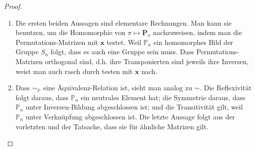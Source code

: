                 \begin{proof}

                    \begin{enumerate}[
                        label = {\texttt{ad} \arabic*.},
                        wide,
                        labelindent = 0pt
                    ]

                        \item Die ersten beiden Aussagen sind elementare Rechnungen.
                        Man kann sie benutzen, um die Homomorphie von $\pi \mapsto \mathbf P_\pi$ nachzuweisen, indem man die Permutations-Matrizen mit $\mathbf x$ testet.
                        Weil $\mathbb P_n$ ein homomorphes Bild der Gruppe $S_n$ folgt, dass es auch eine Gruppe sein muss.
                        Dass Permutations-Matrizen orthogonal sind, d.h. ihre Transponierten sind jeweils ihre Inversen, weist man auch rasch durch testen mit $\mathbf x$ nach.

                        \item Dass $\sim_{\mathbb P}$ eine Äquivalenz-Relation ist, sieht man analog zu $\sim$.
                        Die Reflexivität folgt daraus, dass $\mathbb P_n$ ein neutrales Element hat;
                        die Symmetrie daraus, dass $\mathbb P_n$ unter Inversen-Bildung abgeschlossen ist;
                        und die Transitivität gilt, weil $\mathbb P_n$ unter Verknüpfung abgeschlossen ist.
                        Die letzte Aussage folgt aus der vorletzten und der Tatsache, dass sie für ähnliche Matrizen gilt.

                    \end{enumerate}    

                \end{proof}

